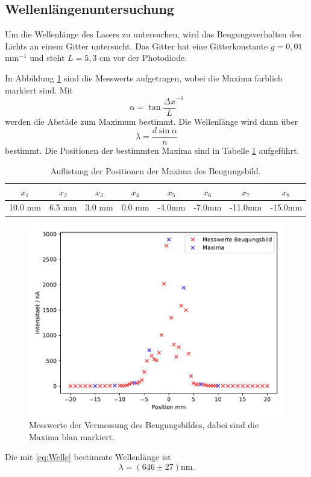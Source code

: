 \subsection{Wellenlängenuntersuchung}
Um die Wellenlänge des Lasers zu untersuchen, wird das Beugungsverhalten des Lichts an
einem Gitter untersucht. Das Gitter hat eine Gitterkonstante $g=0,01$mm$^{-1}$ und steht
$L=5,3$ cm vor der Photodiode.

In Abbildung \ref{fig:Welle} sind die Messwerte aufgetragen, wobei die Maxima farblich markiert sind. Mit
\begin{equation}
  \alpha = \tan{\frac{\Delta x}{L}}^{-1}
\end{equation}
werden die Abstäde zum Maximum bestimmt. Die Wellenlänge wird dann über
\begin{equation}
  \lambda=\frac{d\sin{\alpha}}{n}
  \label{eq:Welle}
\end{equation}
bestimmt.
Die Positionen der bestimmten Maxima sind in Tabelle \ref{tab:Max} aufgeführt.
\begin{table}[H]
    \centering
    \caption{Auflistung der Positionen der Maxima des Beugungsbild.}
    \label{tab:Max}
    \begin{tabular}{c|c|c|c|c|c|c|c}
        \toprule
        $x_1$& $x_2$ & $x_3$ & $x_4$ & $x_5$ & $x_6$ & $x_7$ & $x_8$\\
        \midrule
        10.0 mm & 6.5 mm & 3.0 mm & 0.0 mm & -4.0mm & -7.0mm & -11.0mm & -15.0mm \\
        \bottomrule
    \end{tabular}
\end{table}
\begin{figure}[H]
  \centering
  \includegraphics{plots/Wellenlaenge.pdf}
  \caption{Messwerte der Vermessung des Beugungsbildes, dabei sind die Maxima blau markiert.}
  \label{fig:Welle}
\end{figure}
Die mit \ref{eq:Welle} bestimmte Wellenlänge ist
\begin{equation*}
  \lambda= (646 \pm 27) \text{nm} .
\end{equation*}

